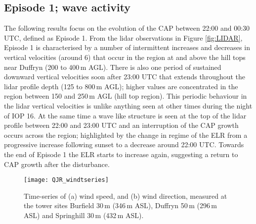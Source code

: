 \documentclass[times]{qjrms4}
\begin{document}
\subsection{Episode 1; wave activity}
\label{ep1}
The following results focus on the evolution of the CAP between 22:00 and 00:30 UTC, defined as Episode 1. From the lidar observations in Figure \ref{fig:LIDAR}, Episode 1 is characterised by a number of intermittent increases and decreases in vertical velocities (around 6) that occur in the region at and above the hill tops near Duffryn (200 to 400$\,\mbox{m}$ AGL). There is also one period of sustained downward vertical velocities soon after 23:00 UTC that extends throughout the lidar profile depth (125 to 800$\,\mbox{m}$ AGL); higher values are concentrated in the region between 150 and 250$\,\mbox{m}$ AGL (hill top region). This periodic behaviour in the lidar vertical velocities is unlike anything seen at other times during the night of IOP 16. At the same time a wave like structure is seen at the top of the lidar profile between 22:00 and 23:00 UTC and an interruption of the CAP growth occurs across the region; highlighted by the change in regime of the ELR from a progressive increase following sunset to a decrease around 22:00 UTC. Towards the end of Episode 1 the ELR starts to increase again, suggesting a return to CAP growth after the disturbance.
%
       \begin{figure*}
        \centering
        \texttt{[image: QJR\_windtseries]}
        \caption{Time-series of (a) wind speed, and (b) wind direction, measured at the tower sites Burfield 30$\,\mbox{m}$ (346$\,\mbox{m}$ ASL), Duffryn 50$\,\mbox{m}$ (296$\,\mbox{m}$ ASL) and Springhill 30$\,\mbox{m}$ (432$\,\mbox{m}$ ASL).}
        \label{fig:windtseries}
        \end{figure*}
        
\end{document}
